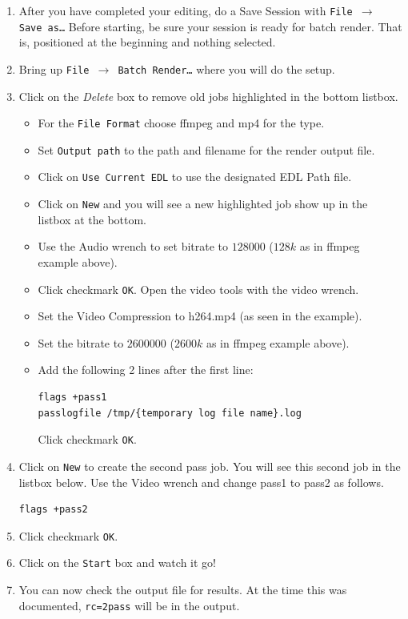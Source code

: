 \begin{enumerate}
    \item After you have completed your editing, do a Save Session with \texttt{File $\rightarrow$ Save as\dots}
    Before starting, be sure your session is ready for batch render. That is, positioned at the beginning and nothing selected.
    \item Bring up \texttt{File $\rightarrow$ Batch Render\dots} where you will do the setup.
    \item Click on the \textit{Delete} box  to remove old jobs highlighted in the bottom listbox.
    \begin{itemize}
        \item For the \texttt{File Format} choose ffmpeg and mp4 for the type.
        \item Set \texttt{Output path} to the path and filename for the render output file.
        \item Click on \texttt{Use Current EDL} to use the designated EDL Path file.
        \item Click on \texttt{New} and you will see a new highlighted job show up in the listbox at the bottom.
        \item Use the Audio wrench to set bitrate to $128000$ ($128k$ as in ffmpeg example above).
        \item Click checkmark \texttt{OK}.  Open the video tools with the video wrench.
        \item Set the Video Compression to h264.mp4 (as seen in the example).
        \item Set the bitrate to $2600000$ ($2600k$ as in ffmpeg example above).
        \item Add the following 2 lines after the first line:
        \begin{lstlisting}[language=bash,numbers=none]
flags +pass1
passlogfile /tmp/{temporary log file name}.log
        \end{lstlisting}
        Click checkmark \texttt{OK}.
    \end{itemize}    
    \item Click on \texttt{New} to create the second pass job.  You will see this second job in the listbox below.
     Use the Video wrench and change pass1 to pass2 as follows.
        \begin{lstlisting}[language=bash,numbers=none]
flags +pass2
        \end{lstlisting}
    \item Click checkmark \texttt{OK}.
    \item Click on the \texttt{Start} box and watch it go!
    \item You can now check the output file for results.  At the time this was documented, \texttt{rc=2pass} will be
        in the output.    
\end{enumerate}

